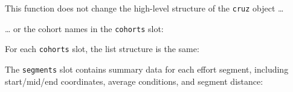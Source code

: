 \documentclass[
]{book}
\newenvironment{Shaded}{\begin{snugshade}}{\end{snugshade}}
\newcommand{\DecValTok}[1]{\textcolor[rgb]{0.00,0.00,0.81}{#1}}
\newcommand{\NormalTok}[1]{#1}
\newcommand{\OperatorTok}[1]{\textcolor[rgb]{0.81,0.36,0.00}{\textbf{#1}}}
\newcommand{\StringTok}[1]{\textcolor[rgb]{0.31,0.60,0.02}{#1}}
\begin{document}
This function does not change the high-level structure of the \texttt{cruz} object \ldots{}

\begin{Shaded}
\end{Shaded}

\ldots{} or the cohort names in the \texttt{cohorts} slot:

\begin{Shaded}
\end{Shaded}

For each \texttt{cohorts} slot, the list structure is the same:

\begin{Shaded}
\end{Shaded}

The \texttt{segments} slot contains summary data for each effort segment, including start/mid/end coordinates, average conditions, and segment distance:
\end{document}
